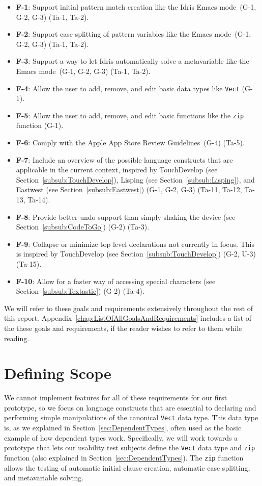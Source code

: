 \begin{itemize}
	\item \textbf{F-1}: Support initial pattern match creation like the Idris Emacs mode\,\cite{Idris:EmacsMode} (G-1, G-2, G-3)
	(Ta-1, Ta-2).
	\item \textbf{F-2}: Support case splitting of pattern variables like the Emacs mode\,\cite{Idris:EmacsMode} (G-1, G-2, G-3) (Ta-1, Ta-2).
	\item \textbf{F-3}: Support a way to let Idris automatically solve a metavariable like the Emacs mode\,\cite{Idris:EmacsMode} (G-1, G-2, G-3) (Ta-1, Ta-2).
	\item \textbf{F-4}: Allow the user to add, remove, and edit basic data types like \texttt{Vect} (G-1).
	\item \textbf{F-5}: Allow the user to add, remove, and edit basic functions like the \texttt{zip} function (G-1).
	\item \textbf{F-6}: Comply with the Apple App Store Review Guidelines\,\cite{AppStoreGuidelines} (G-4)
	(Ta-5).
	\item \textbf{F-7}: Include an overview of the possible language constructs that are applicable in the current context, inspired by TouchDevelop (see Section~\ref{subsub:TouchDevelop}), Lisping (see Section~\ref{subsub:Lisping}), and Eastwest (see Section~\ref{subsub:Eastwest}) (G-1, G-2, G-3)
	(Ta-11, Ta-12, Ta-13, Ta-14).
	\item \textbf{F-8}: Provide better undo support than simply shaking the device (see Section~\ref{subsub:CodeToGo}) (G-2)
	(Ta-3).
	\item \textbf{F-9}: Collapse or minimize top level declarations not currently in focus. This is inspired by TouchDevelop (see Section~\ref{subsub:TouchDevelop}) (G-2, U-3)
	(Ta-15).
	\item \textbf{F-10}: Allow for a faster way of accessing special characters (see Section~\ref{subsub:Textastic}) (G-2)
	(Ta-4).
\end{itemize}

We will refer to these goals and requirements extensively throughout the rest of this report. Appendix~\ref{chap:ListOfAllGoalsAndRequirements} includes a list of the these goals and requirements, if the reader wishes to refer to them while reading.

\section{Defining Scope} 
\label{sec:defining_scope}
We cannot implement features for all of these requirements for our first prototype, so we focus on language constructs that are essential to declaring and performing simple manipulations of the canonical \texttt{Vect} data type. This data type is, as we explained in Section~\ref{sec:DependentTypes}, often used as the basic example of how dependent types work.
Specifically, we will work towards a prototype that lets our usability test subjects define the \texttt{Vect} data type and \texttt{zip} function (also explained in
Section~\ref{sec:DependentTypes}).
The \texttt{zip} function allows the testing of automatic initial clause creation, automatic case splitting, and metavariable solving.


